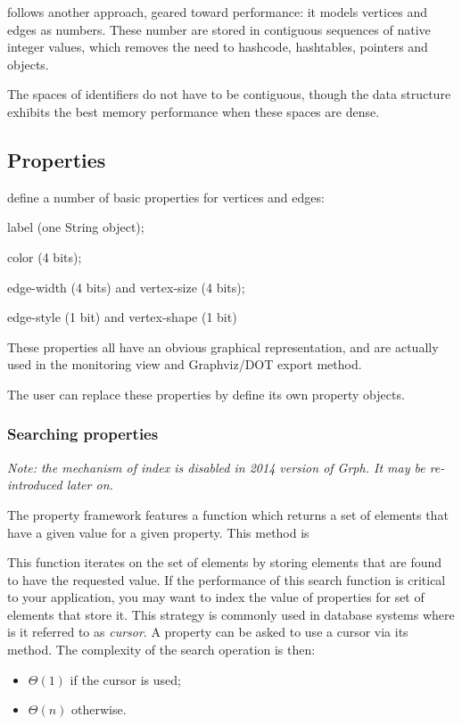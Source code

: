 \documentclass{article}
\begin{document}
\grph follows another approach, geared toward  performance:
it models vertices and edges as numbers. These number are stored in contiguous sequences of native integer values, which
removes the need to hashcode, hashtables, pointers and objects.

The spaces of identifiers do not have to be contiguous, though the data structure exhibits the best
memory performance when these spaces are dense.

\subsection{Properties}


\grph define a number of basic properties for vertices and edges:
\begin{description}
  \item label (one String object);
  \item color (4 bits);
  \item edge-width (4 bits)  and vertex-size (4 bits);
  \item edge-style (1 bit) and vertex-shape (1 bit)
\end{description}

These properties all have an obvious graphical representation, and are actually used in the monitoring view and
Graphviz/DOT export method. 

The user can replace these properties by define its own property objects.



\subsubsection{Searching properties}

\textit{Note: the mechanism of index is disabled in 2014 version of Grph. It may be re-introduced later on.}

The property framework \grph features a function which returns a set of elements that have a given value for a given property.
This method is 

This function iterates on the set of elements by storing elements that are found to have the requested value.
If the performance of this search function is critical to your application, you may want to index
the value of properties for set of elements that store it. This strategy is commonly used in database systems where is it referred to as \textit{cursor}.
A property can be asked to use a cursor via its  method.  
The complexity of the search operation is then:
\begin{itemize}
  \item $\Theta(1)$ if the cursor is used;
  \item $\Theta(n)$ otherwise.
\end{itemize}
\end{document}
